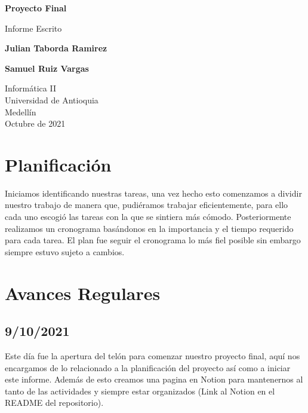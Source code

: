\documentclass{article}
\begin{document}
\begin{titlepage}
    \begin{center}
        \vspace*{1cm}
            
        \Huge
        \textbf{Proyecto Final}
            
        \vspace{0.5cm}
        \LARGE
        Informe Escrito
            
        \vspace{1.5cm}
            
        \textbf{Julian Taborda Ramirez}
        
        \vspace{0.5cm}
        
        \textbf{Samuel Ruiz Vargas}
            
        \vfill
            
        \vspace{0.8cm}
            
        \Large
        Informática II\\
        Universidad de Antioquia\\
        Medellín\\
        Octubre de 2021
            
    \end{center}
\end{titlepage}

\tableofcontents
\vspace*{1.2cm}

\newpage

\section{Planificación}
        Iniciamos identificando nuestras tareas, una vez hecho esto comenzamos a dividir nuestro trabajo de manera que, pudiéramos trabajar eficientemente, para ello cada uno escogió las tareas con la que se sintiera más cómodo. Posteriormente realizamos un cronograma basándonos en la importancia y el tiempo requerido para cada tarea. El plan fue seguir el cronograma lo más fiel posible sin embargo siempre estuvo sujeto a cambios. 

\section{Avances Regulares}
    \subsection{9/10/2021}
        Este día fue la apertura del telón para comenzar nuestro proyecto final, aquí nos encargamos de lo relacionado a la planificación del proyecto así como a iniciar este informe. Además de esto creamos una pagina en Notion para mantenernos al tanto de las actividades y siempre estar organizados (Link al Notion en el README del repositorio).
    
\end{document}
